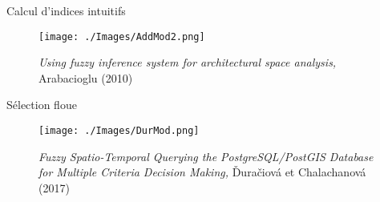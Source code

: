 \documentclass{beamer}
\begin{document}
\begin{frame}{Calcul d'indices \og intuitifs \fg}
  	\begin{figure}
		\centering
		\texttt{[image: ./Images/AddMod2.png]}
		\caption{\emph{Using fuzzy inference system for architectural space analysis,} Arabacioglu (2010)}
	\end{figure}
\end{frame}

\begin{frame}{Sélection floue}
  	\begin{figure}
		\centering
		\texttt{[image: ./Images/DurMod.png]}
		\caption{\emph{Fuzzy Spatio-Temporal Querying the PostgreSQL/PostGIS Database for Multiple Criteria Decision Making,}  Ďuračiová et Chalachanová  (2017)}
	\end{figure}
\end{frame}
\end{document}
